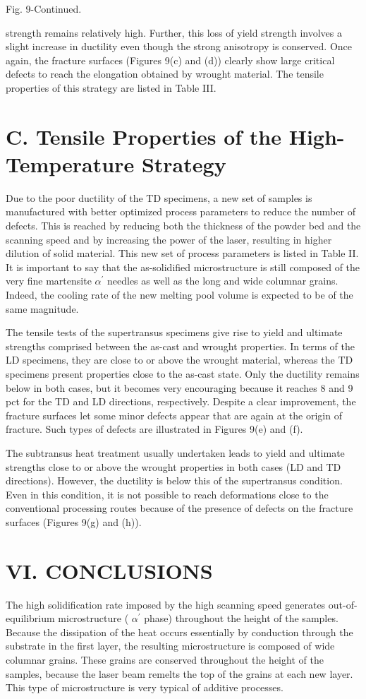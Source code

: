 \documentclass[10pt]{article}
\begin{document}
Fig. 9-Continued.

strength remains relatively high. Further, this loss of yield strength involves a slight increase in ductility even though the strong anisotropy is conserved. Once again, the fracture surfaces (Figures 9(c) and (d)) clearly show large critical defects to reach the elongation obtained by wrought material. The tensile properties of this strategy are listed in Table III.

\section*{C. Tensile Properties of the High-Temperature Strategy}
Due to the poor ductility of the TD specimens, a new set of samples is manufactured with better optimized process parameters to reduce the number of defects. This is reached by reducing both the thickness of the powder bed and the scanning speed and by increasing the power of the laser, resulting in higher dilution of solid material. This new set of process parameters is listed in Table II. It is important to say that the as-solidified microstructure is still composed of the very fine martensite $\alpha^{\prime}$ needles as well as the long and wide columnar grains. Indeed, the cooling rate of the new melting pool volume is expected to be of the same magnitude.

The tensile tests of the supertransus specimens give rise to yield and ultimate strengths comprised between the as-cast and wrought properties. In terms of the LD specimens, they are close to or above the wrought material, whereas the TD specimens present properties close to the as-cast state. Only the ductility remains below in both cases, but it becomes very encouraging because it reaches 8 and 9 pct for the TD and LD directions, respectively. Despite a clear improvement, the fracture surfaces let some minor defects appear that are again at the origin of fracture. Such types of defects are illustrated in Figures 9(e) and (f).

The subtransus heat treatment usually undertaken leads to yield and ultimate strengths close to or above the wrought properties in both cases (LD and TD directions). However, the ductility is below this of the supertransus condition. Even in this condition, it is not possible to reach deformations close to the conventional processing routes because of the presence of defects on the fracture surfaces (Figures 9(g) and (h)).

\section*{VI. CONCLUSIONS}
The high solidification rate imposed by the high scanning speed generates out-of-equilibrium microstructure ( $\alpha^{\prime}$ phase) throughout the height of the samples. Because the dissipation of the heat occurs essentially by conduction through the substrate in the first layer, the resulting microstructure is composed of wide columnar grains. These grains are conserved throughout the height of the samples, because the laser beam remelts the top of the grains at each new layer. This type of microstructure is very typical of additive processes.
\end{document}
